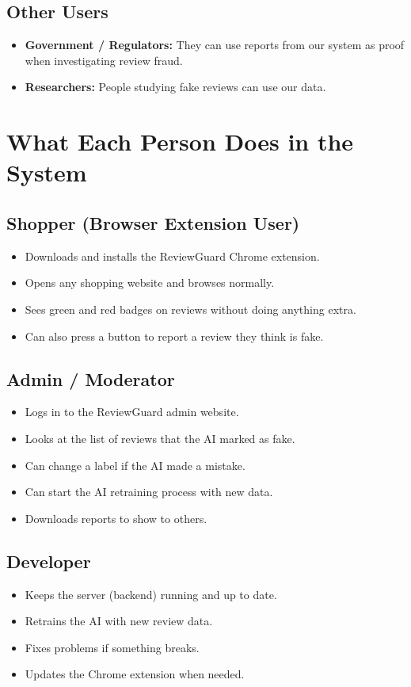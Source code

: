 \documentclass[10pt, a4paper]{report}
\begin{document}
\subsection{Other Users}

\begin{itemize}
  \item \textbf{Government / Regulators:} They can use reports from our system as proof when investigating review fraud.
  \item \textbf{Researchers:} People studying fake reviews can use our data.
\end{itemize}

\section{What Each Person Does in the System}

\subsection{Shopper (Browser Extension User)}
\begin{itemize}
  \item Downloads and installs the ReviewGuard Chrome extension.
  \item Opens any shopping website and browses normally.
  \item Sees green and red badges on reviews without doing anything extra.
  \item Can also press a button to report a review they think is fake.
\end{itemize}

\subsection{Admin / Moderator}
\begin{itemize}
  \item Logs in to the ReviewGuard admin website.
  \item Looks at the list of reviews that the AI marked as fake.
  \item Can change a label if the AI made a mistake.
  \item Can start the AI retraining process with new data.
  \item Downloads reports to show to others.
\end{itemize}

\subsection{Developer}
\begin{itemize}
  \item Keeps the server (backend) running and up to date.
  \item Retrains the AI with new review data.
  \item Fixes problems if something breaks.
  \item Updates the Chrome extension when needed.
\end{itemize}
\end{document}
